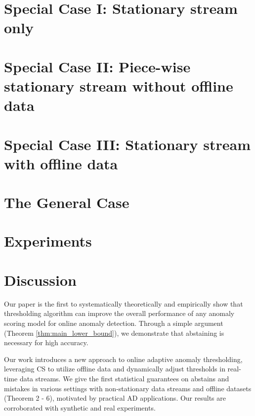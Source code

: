 

\section{Special Case I: Stationary stream only} %



\section{Special Case II: Piece-wise stationary stream without offline data}
\label{sec:offline-only}



\section{Special Case III: Stationary stream with offline data}


\section{The General Case} %



\section{Experiments}




\section{Discussion}

Our paper is the first to systematically theoretically and empirically show that thresholding algorithm can improve the overall performance of any anomaly scoring model for online anomaly detection. Through a simple argument (Theorem \ref{thm:main_lower_bound}), we demonstrate that abstaining is necessary for high accuracy. 

Our work introduces a new approach to online adaptive anomaly thresholding, leveraging CS to utilize offline data and dynamically adjust thresholds in real-time data streams. We give the first statistical guarantees on abstains and mistakes in various settings with non-stationary data streams and offline datasets (Theorem 2 - 6), motivated by practical AD applications. Our results are corroborated with synthetic and real experiments. %


